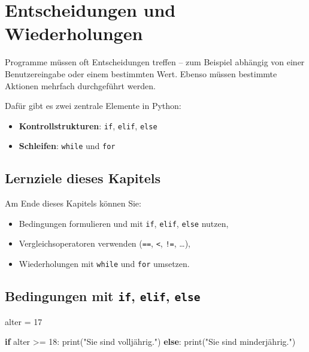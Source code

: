 \documentclass[
  letterpaper,
  DIV=11,
  numbers=noendperiod]{scrreprt}
\newenvironment{Shaded}{\begin{snugshade}}{\end{snugshade}}
\newcommand{\BuiltInTok}[1]{\textcolor[rgb]{0.00,0.23,0.31}{#1}}
\newcommand{\ControlFlowTok}[1]{\textcolor[rgb]{0.00,0.23,0.31}{\textbf{#1}}}
\newcommand{\DecValTok}[1]{\textcolor[rgb]{0.68,0.00,0.00}{#1}}
\newcommand{\NormalTok}[1]{\textcolor[rgb]{0.00,0.23,0.31}{#1}}
\newcommand{\OperatorTok}[1]{\textcolor[rgb]{0.37,0.37,0.37}{#1}}
\newcommand{\StringTok}[1]{\textcolor[rgb]{0.13,0.47,0.30}{#1}}
\providecommand{\tightlist}{%
  \setlength{\itemsep}{0pt}\setlength{\parskip}{0pt}}\usepackage{longtable,booktabs,array}
\begin{document}
\chapter{Entscheidungen und
Wiederholungen}\label{entscheidungen-und-wiederholungen}

Programme müssen oft Entscheidungen treffen -- zum Beispiel abhängig von
einer Benutzereingabe oder einem bestimmten Wert. Ebenso müssen
bestimmte Aktionen mehrfach durchgeführt werden.

Dafür gibt es zwei zentrale Elemente in Python:

\begin{itemize}
\tightlist
\item
  \textbf{Kontrollstrukturen}: \texttt{if}, \texttt{elif}, \texttt{else}
\item
  \textbf{Schleifen}: \texttt{while} und \texttt{for}
\end{itemize}

\section{Lernziele dieses Kapitels}\label{lernziele-dieses-kapitels-2}

Am Ende dieses Kapitels können Sie:

\begin{itemize}
\tightlist
\item
  Bedingungen formulieren und mit \texttt{if}, \texttt{elif},
  \texttt{else} nutzen,
\item
  Vergleichsoperatoren verwenden (\texttt{==}, \texttt{\textless{}},
  \texttt{!=}, \ldots),
\item
  Wiederholungen mit \texttt{while} und \texttt{for} umsetzen.
\end{itemize}

\section{\texorpdfstring{Bedingungen mit \texttt{if}, \texttt{elif},
\texttt{else}}{Bedingungen mit if, elif, else}}\label{bedingungen-mit-if-elif-else}

\begin{Shaded}
\begin{Highlighting}[]
\NormalTok{alter }\OperatorTok{=} \DecValTok{17}

\ControlFlowTok{if}\NormalTok{ alter }\OperatorTok{\textgreater{}=} \DecValTok{18}\NormalTok{:}
    \BuiltInTok{print}\NormalTok{(}\StringTok{"Sie sind volljährig."}\NormalTok{)}
\ControlFlowTok{else}\NormalTok{:}
    \BuiltInTok{print}\NormalTok{(}\StringTok{"Sie sind minderjährig."}\NormalTok{)}
\end{Highlighting}
\end{Shaded}
\end{document}
